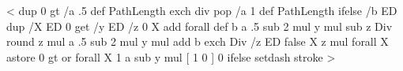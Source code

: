 %
\def\psls@dashed{%
  \ifpsdashadjust
    [ \psk@dash ] \@ifundefined{pst@linetype}{2}{\pst@linetype}\space \tx@DashLine
  \else
    [ \psk@dash ] 0 setdash stroke
  \fi}
<
    dup 0 gt
    { /a .5 def PathLength exch div }
    { pop /a 1 def PathLength } ifelse
    /b ED %
    dup /X ED %
    0 get /y ED %
    /z 0 X {add} forall def %
    b a .5 sub 2 mul y mul sub z Div round
    z mul a .5 sub 2 mul y mul add b exch Div
    /z ED %
    false %
    X { z mul } forall X astore %
    {0 gt or} forall
    { X 1 a sub y mul }
    { [ 1 0 ] 0 }
    ifelse
    setdash stroke >
%
%
%
\def\psFormatInt{\def\pst@par{}\pst@object{psFormatInt}}
\def\psFormatInt@i#1{{%
  \pst@killglue
  \use@par
  \count1=#1\count2=\count1
  \ifnum\count1=0 0\else
    \ifnum\count1>999999
    \count3=\count1
    \divide\count3 by 1000000
    \the\count3\psk@intSeparator\relax
    \multiply\count3 by 1000000
    \advance\count1 by -\count3 %
  \fi%
  \ifnum\count2>999
    \count3=\count1
    \divide\count3 by 1000
    \ifnum\count2>99999
	\ifnum\count3<100 0\fi
	\ifnum\count3<10 0\fi
    \fi%
    \the\count3\psk@intSeparator\relax
    \multiply\count3 by 1000
    \advance\count1 by -\count3 %
  \fi%
  \ifnum\count2>999
    \ifnum\count1<100 0\fi
    \ifnum\count1<10 0\fi
  \fi%
  \the\count1
  \fi%
}\ignorespaces}
%
\newdimen\pst@braceWidth
{}
